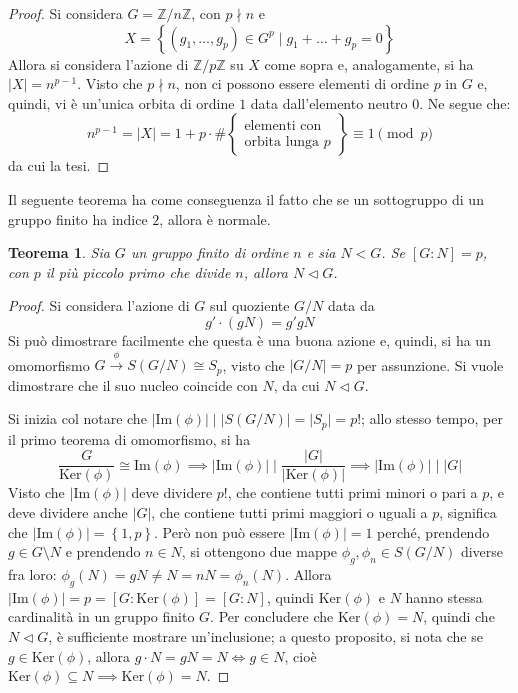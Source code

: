 \documentclass[11pt]{scrartcl}
\theoremstyle{style}
\newtheorem{teorema}{Teorema}[section]
\newenvironment{boxenv}[1][]{
    \begin{eqbox}[#1]
    }{
   \end{eqbox}
}
\numberwithin{equation}{subsection}
\begin{document}
	\begin{proof}
		Si considera $G = \mathbb{Z}/ n \mathbb{Z}$, con $p  \nmid n$ e 
		\[
		X = \left\{ (g_1,\ldots,g_p) \in G^p  \mid g_1+ \ldots+ g_p = 0 \right\} 
		\] 
		Allora si considera l'azione di $\mathbb{Z} / p \mathbb{Z}$ su $X$ come sopra e, analogamente, si ha $\lvert X \rvert  = n^{p-1} $.
		Visto che $p \nmid n$, non ci possono essere elementi di ordine $p$ in $G$ e, quindi, vi \`e un'unica orbita di ordine $1$ data dall'elemento neutro $0$.
		Ne segue che:
		\[
		n^{p-1} = \lvert X \rvert  = 1 + p \cdot \# \left\{ \substack{\displaystyle \text{elementi con}\\ \displaystyle \text{orbita lunga } p} \right\} \equiv 1 \pmod{p} 
		\] 
		da cui la tesi.
	\end{proof}
	Il seguente teorema ha come conseguenza il fatto che se un sottogruppo di un gruppo finito ha indice $2$, allora \`e normale.
	\begin{boxenv}[]
	\begin{teorema}
	Sia $G$	un gruppo finito di ordine $n$ e sia $N<G$. 
	Se $[G:N]=p$, con $p$ il pi\`u piccolo primo che divide $n$, allora $N \lhd G$.
	\end{teorema}
	\end{boxenv}
\begin{proof}
	Si considera l'azione di $G$ sul quoziente $G / N$ data da 
	\[
	g' \cdot (gN) = g'gN
	\] 
	Si pu\`o dimostrare facilmente che questa \`e una buona azione e, quindi, si ha un omomorfismo $G \stackrel{\phi }{\longrightarrow } S(G/N) \cong S_p$, visto che $\lvert G / N \rvert = p$ per assunzione. 
Si vuole dimostrare che il suo nucleo coincide con $N$, da cui $N \lhd G$.

Si inizia col notare che $\lvert \mathrm{Im} (\phi ) \rvert  \mid \lvert S(G/N) \rvert = \lvert S_p \rvert =p!$; allo stesso tempo, per il primo teorema di omomorfismo, si ha 
\[
	\frac{G}{\mathrm{Ker} (\phi )}\cong \mathrm{Im} (\phi )\implies \lvert \mathrm{Im} (\phi ) \rvert  \mid \frac{\lvert G \rvert  }{\lvert \mathrm{Ker} (\phi ) \rvert }\implies \lvert \mathrm{Im} (\phi ) \rvert  \mid \lvert G \rvert 
\] 
Visto che $\lvert \mathrm{Im} (\phi ) \rvert  $ deve dividere $p!$, che contiene tutti primi minori o pari a $p$, e deve dividere anche $\lvert G \rvert $, che contiene tutti primi maggiori o uguali a $p$, significa che $\lvert \mathrm{Im} (\phi ) \rvert = \left\{ 1,p \right\} $.
Per\`o non pu\`o essere $|\mathrm{Im} (\phi )| =1$ perch\'e, prendendo $g \in G \setminus N$ e prendendo $n \in N$, si ottengono due mappe $\phi _g,\phi _n \in S(G / N)$ diverse fra loro: $\phi _g (N) = gN \neq N = nN=\phi _n(N)$.
Allora $\lvert \mathrm{Im} (\phi ) \rvert =p = [G : \mathrm{Ker} (\phi )] = [ G : N ]$, quindi $\mathrm{Ker} (\phi )$ e $ N$ hanno stessa cardinalit\`a in un gruppo finito $G$.
Per concludere che $\mathrm{Ker}( \phi) = N$, quindi che $N \lhd G$, \`e sufficiente mostrare un'inclusione; a questo proposito, si nota che se $g \in \mathrm{Ker} (\phi )$, allora $g \cdot N = gN = N \iff g \in N$, cio\`e $\mathrm{Ker} (\phi ) \subseteq N\implies \mathrm{Ker}( \phi ) = N$.
\end{proof}	
\end{document}
